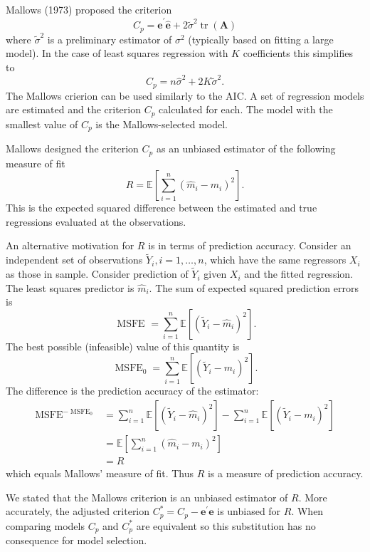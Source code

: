 \documentclass[10pt]{article}
\begin{document}
Mallows (1973) proposed the criterion
$$
C_{p}=\widehat{\boldsymbol{e}}^{\prime} \widehat{\boldsymbol{e}}+2 \widetilde{\sigma}^{2} \operatorname{tr}(\boldsymbol{A})
$$
where $\widetilde{\sigma}^{2}$ is a preliminary estimator of $\sigma^{2}$ (typically based on fitting a large model). In the case of least squares regression with $K$ coefficients this simplifies to
$$
C_{p}=n \widehat{\sigma}^{2}+2 K \widetilde{\sigma}^{2} .
$$
The Mallows crierion can be used similarly to the AIC. A set of regression models are estimated and the criterion $C_{p}$ calculated for each. The model with the smallest value of $C_{p}$ is the Mallows-selected model.

Mallows designed the criterion $C_{p}$ as an unbiased estimator of the following measure of fit
$$
R=\mathbb{E}\left[\sum_{i=1}^{n}\left(\widehat{m}_{i}-m_{i}\right)^{2}\right] .
$$
This is the expected squared difference between the estimated and true regressions evaluated at the observations.

An alternative motivation for $R$ is in terms of prediction accuracy. Consider an independent set of observations $\widetilde{Y}_{i}, i=1, \ldots, n$, which have the same regressors $X_{i}$ as those in sample. Consider prediction of $\widetilde{Y}_{i}$ given $X_{i}$ and the fitted regression. The least squares predictor is $\widehat{m}_{i}$. The sum of expected squared prediction errors is
$$
\text { MSFE }=\sum_{i=1}^{n} \mathbb{E}\left[\left(\widetilde{Y}_{i}-\widehat{m}_{i}\right)^{2}\right] .
$$
The best possible (infeasible) value of this quantity is
$$
\operatorname{MSFE}_{0}=\sum_{i=1}^{n} \mathbb{E}\left[\left(\widetilde{Y}_{i}-m_{i}\right)^{2}\right] .
$$
The difference is the prediction accuracy of the estimator:
$$
\begin{aligned}
\operatorname{MSFE}^{-\operatorname{MSFE}_{0}} &=\sum_{i=1}^{n} \mathbb{E}\left[\left(\widetilde{Y}_{i}-\widehat{m}_{i}\right)^{2}\right]-\sum_{i=1}^{n} \mathbb{E}\left[\left(\widetilde{Y}_{i}-m_{i}\right)^{2}\right] \\
&=\mathbb{E}\left[\sum_{i=1}^{n}\left(\widehat{m}_{i}-m_{i}\right)^{2}\right] \\
&=R
\end{aligned}
$$
which equals Mallows' measure of fit. Thus $R$ is a measure of prediction accuracy.

We stated that the Mallows criterion is an unbiased estimator of $R$. More accurately, the adjusted criterion $C_{p}^{*}=C_{p}-\boldsymbol{e}^{\prime} \boldsymbol{e}$ is unbiased for $R$. When comparing models $C_{p}$ and $C_{p}^{*}$ are equivalent so this substitution has no consequence for model selection.
\end{document}
